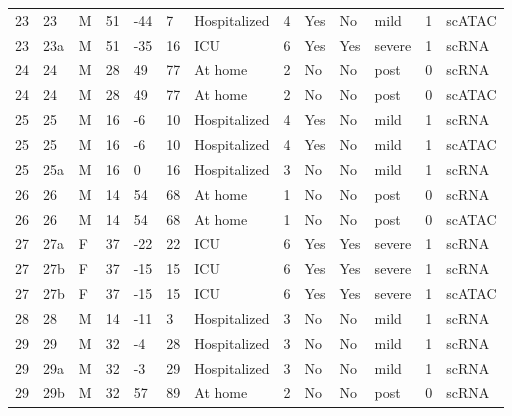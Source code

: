 \documentclass{book}
\begin{document}
\begin{refsection}
\begin{landscape}
\begin{longtable}{p{0.7cm}p{0.7cm}p{0.5cm}p{0.75cm}p{0.75cm}p{0.75cm}p{1.75cm}p{0.8cm}p{0.75cm}p{1cm}p{0.75cm}p{1cm}p{0.75cm}}
    23 & 23  & M & 51 & -44 & 7   & Hospitalized                                       & 4 & Yes & No  & mild   & 1 & scATAC \\
    23 & 23a & M & 51 & -35 & 16  & ICU                                                & 6 & Yes & Yes & severe & 1 & scRNA \\
    24 & 24  & M & 28 & 49  & 77  & At home                                            & 2 & No  & No  & post   & 0 & scRNA \\
    24 & 24  & M & 28 & 49  & 77  & At home                                            & 2 & No  & No  & post   & 0 & scATAC \\
    25 & 25  & M & 16 & -6  & 10  & Hospitalized                                       & 4 & Yes & No  & mild   & 1 & scRNA \\
    25 & 25  & M & 16 & -6  & 10  & Hospitalized                                       & 4 & Yes & No  & mild   & 1 & scATAC \\
    25 & 25a & M & 16 & 0   & 16  & Hospitalized                                       & 3 & No  & No  & mild   & 1 & scRNA \\
    26 & 26  & M & 14 & 54  & 68  & At home                                            & 1 & No  & No  & post   & 0 & scRNA \\
    26 & 26  & M & 14 & 54  & 68  & At home                                            & 1 & No  & No  & post   & 0 & scATAC \\
    27 & 27a & F & 37 & -22 & 22  & ICU                                                & 6 & Yes & Yes & severe & 1 & scRNA \\
    27 & 27b & F & 37 & -15 & 15  & ICU                                                & 6 & Yes & Yes & severe & 1 & scRNA \\
    27 & 27b & F & 37 & -15 & 15  & ICU                                                & 6 & Yes & Yes & severe & 1 & scATAC \\
    28 & 28  & M & 14 & -11 & 3   & Hospitalized                                       & 3 & No  & No  & mild   & 1 & scRNA \\
    29 & 29  & M & 32 & -4  & 28  & Hospitalized                                       & 3 & No  & No  & mild   & 1 & scRNA \\
    29 & 29a & M & 32 & -3  & 29  & Hospitalized                                       & 3 & No  & No  & mild   & 1 & scRNA \\
    29 & 29b & M & 32 & 57  & 89  & At home                                            & 2 & No  & No  & post   & 0 & scRNA \\

\end{longtable}
\end{landscape}
\end{refsection}
\end{document}
